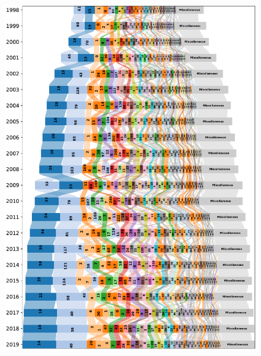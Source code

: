 \documentclass[varwidth, border=0pt]{standalone}
\begin{document}
	
	\begin{figure}
		\includegraphics[width=\linewidth]{../../graphics/sankey_us_reg_0-0_1-0_-1_a-infomap_n100_m1-0_s0_c1000_labels.pdf}
	\end{figure}
	
\end{document}
